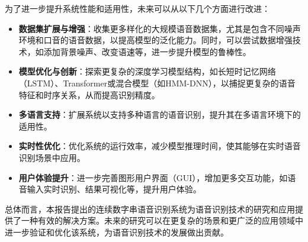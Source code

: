 \documentclass[12pt,hyperref,a4paper,UTF8]{ctexart}
\begin{document}
为了进一步提升系统性能和适用性，未来可以从以下几个方面进行改进：
\begin{itemize}
    \item \textbf{数据集扩展与增强}：收集更多样化的大规模语音数据集，尤其是包含不同噪声环境和口音的语音数据，以提高模型的泛化能力。同时，可以尝试数据增强技术，如添加背景噪声、改变语速等，进一步提升模型的鲁棒性。
    \item \textbf{模型优化与创新}：探索更复杂的深度学习模型结构，如长短时记忆网络（LSTM）、Transformer或混合模型（如HMM-DNN），以捕捉更复杂的语音特征和时序关系，从而提高识别精度。
    \item \textbf{多语言支持}：扩展系统以支持多种语言的语音识别，提升其在多语言环境下的适用性。
    \item \textbf{实时性优化}：优化系统的运行效率，减少模型推理时间，使其能够在实时语音识别场景中应用。
    \item \textbf{用户体验提升}：进一步完善图形用户界面（GUI），增加更多交互功能，如语音输入实时识别、结果可视化等，提升用户体验。
\end{itemize}

总体而言，本报告提出的连续数字串语音识别系统为语音识别技术的研究和应用提供了一种有效的解决方案。未来的研究可以在更复杂的场景和更广泛的应用领域中进一步验证和优化该系统，为语音识别技术的发展做出贡献。



\end{document}
